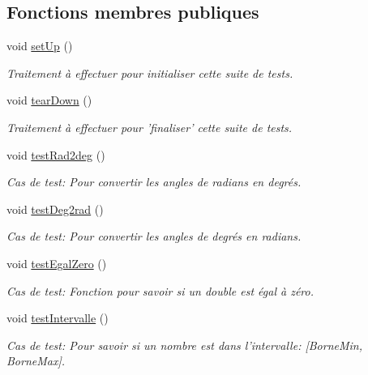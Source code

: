 \subsection*{Fonctions membres publiques}
\begin{DoxyCompactItemize}
\item 
void \hyperlink{group__inf2990_ga3a6ce920fe07fe029450c3221592f43e}{set\-Up} ()
\begin{DoxyCompactList}\small\item\em Traitement à effectuer pour initialiser cette suite de tests. \end{DoxyCompactList}\item 
void \hyperlink{group__inf2990_gac4dc695e75bf75295e629e73cb55abf0}{tear\-Down} ()
\begin{DoxyCompactList}\small\item\em Traitement à effectuer pour 'finaliser' cette suite de tests. \end{DoxyCompactList}\item 
void \hyperlink{group__inf2990_ga99986aa1af0f2f7eba4f0854bd44496b}{test\-Rad2deg} ()
\begin{DoxyCompactList}\small\item\em Cas de test\-: Pour convertir les angles de radians en degrés. \end{DoxyCompactList}\item 
void \hyperlink{group__inf2990_gac029f9bee013cf1991a4b5922515c00b}{test\-Deg2rad} ()
\begin{DoxyCompactList}\small\item\em Cas de test\-: Pour convertir les angles de degrés en radians. \end{DoxyCompactList}\item 
void \hyperlink{group__inf2990_ga82ce5c8ba751ce2773389fc98448718c}{test\-Egal\-Zero} ()
\begin{DoxyCompactList}\small\item\em Cas de test\-: Fonction pour savoir si un double est égal à zéro. \end{DoxyCompactList}\item 
void \hyperlink{group__inf2990_ga5c34fe0b98799c5820e2c4f54e689d98}{test\-Intervalle} ()
\begin{DoxyCompactList}\small\item\em Cas de test\-: Pour savoir si un nombre est dans l'intervalle\-: \mbox{[}Borne\-Min, Borne\-Max\mbox{]}. \end{DoxyCompactList}\end{DoxyCompactItemize}


